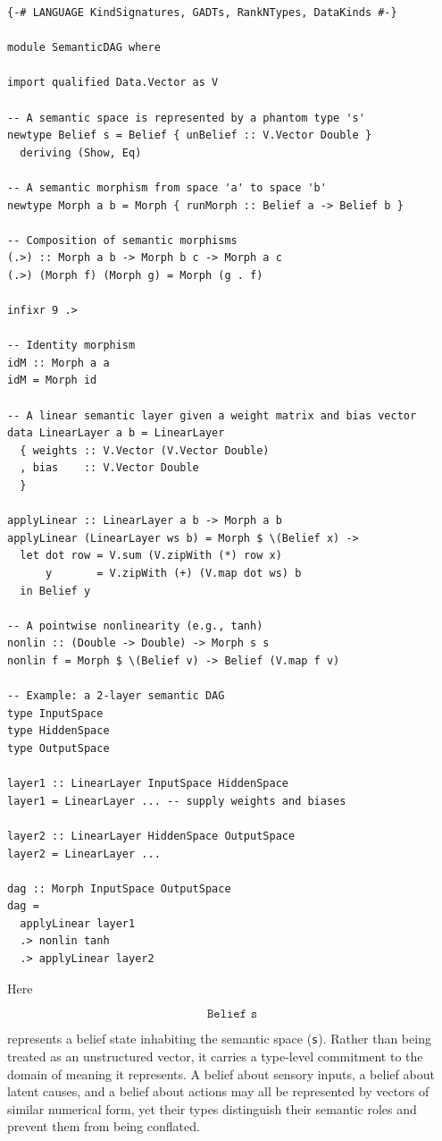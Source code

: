 \documentclass[12pt,letterpaper]{article}
\theoremstyle{remark}
\begin{document}
\begin{verbatim}
{-# LANGUAGE KindSignatures, GADTs, RankNTypes, DataKinds #-}

module SemanticDAG where

import qualified Data.Vector as V

-- A semantic space is represented by a phantom type 's'
newtype Belief s = Belief { unBelief :: V.Vector Double }
  deriving (Show, Eq)

-- A semantic morphism from space 'a' to space 'b'
newtype Morph a b = Morph { runMorph :: Belief a -> Belief b }

-- Composition of semantic morphisms
(.>) :: Morph a b -> Morph b c -> Morph a c
(.>) (Morph f) (Morph g) = Morph (g . f)

infixr 9 .>

-- Identity morphism
idM :: Morph a a
idM = Morph id

-- A linear semantic layer given a weight matrix and bias vector
data LinearLayer a b = LinearLayer
  { weights :: V.Vector (V.Vector Double)
  , bias    :: V.Vector Double
  }

applyLinear :: LinearLayer a b -> Morph a b
applyLinear (LinearLayer ws b) = Morph $ \(Belief x) ->
  let dot row = V.sum (V.zipWith (*) row x)
      y       = V.zipWith (+) (V.map dot ws) b
  in Belief y

-- A pointwise nonlinearity (e.g., tanh)
nonlin :: (Double -> Double) -> Morph s s
nonlin f = Morph $ \(Belief v) -> Belief (V.map f v)

-- Example: a 2-layer semantic DAG
type InputSpace
type HiddenSpace
type OutputSpace

layer1 :: LinearLayer InputSpace HiddenSpace
layer1 = LinearLayer ... -- supply weights and biases

layer2 :: LinearLayer HiddenSpace OutputSpace
layer2 = LinearLayer ...

dag :: Morph InputSpace OutputSpace
dag =
  applyLinear layer1
  .> nonlin tanh
  .> applyLinear layer2
\end{verbatim}

Here

\[
\texttt{Belief s}
\]

represents a belief state inhabiting the semantic space (\texttt{s}). Rather than being treated as an unstructured vector, it carries a type-level commitment to the domain of meaning it represents. A belief about sensory inputs, a belief about latent causes, and a belief about actions may all be represented by vectors of similar numerical form, yet their types distinguish their semantic roles and prevent them from being conflated.
\end{document}
